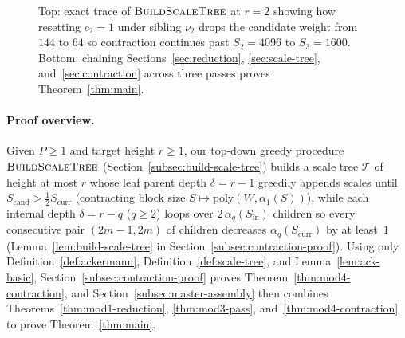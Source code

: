 \documentclass[11pt]{article}
\theoremstyle{definition}
\theoremstyle{remark}
\newcommand{\BuildScaleTree}{\textnormal{\scshape BuildScaleTree}}
\begin{document}
\begin{figure}[ht]
\caption{Top: exact trace of $\BuildScaleTree$ at $r = 2$ showing how resetting $c_2 = 1$ under sibling $\nu_2$ drops the candidate weight from $144$ to $64$ so contraction continues past $S_2 = 4096$ to $S_3 = 1600$. Bottom: chaining Sections~\ref{sec:reduction}, \ref{sec:scale-tree}, and~\ref{sec:contraction} across three passes proves Theorem~\ref{thm:main}.}
\label{fig:build-scale-tree}
\end{figure}

\paragraph{Proof overview.}
Given $P \ge 1$ and target height $r \ge 1$, our top-down greedy procedure $\BuildScaleTree$ (Section~\ref{subsec:build-scale-tree}) builds a scale tree $\mathcal{T}$ of height at most $r$ whose leaf parent depth $\delta = r - 1$ greedily appends scales until $S_{\mathrm{cand}} > \frac{1}{2} S_{\mathrm{curr}}$ (contracting block size $S \mapsto \mathrm{poly}(W, \alpha_1(S))$), while each internal depth $\delta = r - q$ ($q \ge 2$) loops over $2\,\alpha_q(S_{\mathrm{in}})$ children so every consecutive pair $(2m - 1, 2m)$ of children decreases $\alpha_q(S_{\mathrm{curr}})$ by at least~$1$ (Lemma~\ref{lem:build-scale-tree} in Section~\ref{subsec:contraction-proof}). Using only Definition~\ref{def:ackermann}, Definition~\ref{def:scale-tree}, and Lemma~\ref{lem:ack-basic}, Section~\ref{subsec:contraction-proof} proves Theorem~\ref{thm:mod4-contraction}, and Section~\ref{subsec:master-assembly} then combines Theorems~\ref{thm:mod1-reduction}, \ref{thm:mod3-pass}, and~\ref{thm:mod4-contraction} to prove Theorem~\ref{thm:main}.
\end{document}
